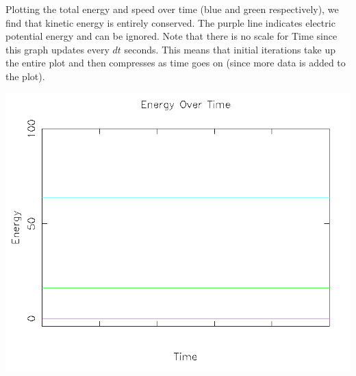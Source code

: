 \documentclass{article}
\begin{document}
Plotting the total energy and speed over time (blue and green respectively),
we find that kinetic energy is entirely conserved.
The purple line indicates electric potential energy and can be ignored.
Note that there is no scale for Time since this graph updates every $dt$ seconds.
This means that initial iterations take up the entire plot and then compresses as time goes on
(since more data is added to the plot).
\\
\begin{center}
    \includegraphics[scale=0.5]{uncharged_2_particles_1D_energy}
\end{center}
\end{document}
